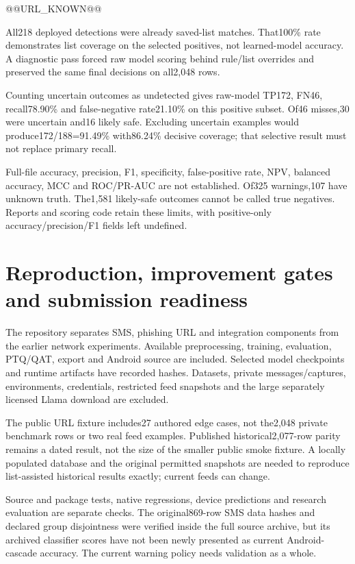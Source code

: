 @@URL_KNOWN@@

All218 deployed detections were already saved-list matches. That100\% rate demonstrates list coverage on the selected positives, not learned-model accuracy. A diagnostic pass forced raw model scoring behind rule/list overrides and preserved the same final decisions on all2,048 rows.

Counting uncertain outcomes as undetected gives raw-model TP172, FN46, recall78.90\% and false-negative rate21.10\% on this positive subset. Of46 misses,30 were uncertain and16 likely safe. Excluding uncertain examples would produce172/188=91.49\% with86.24\% decisive coverage; that selective result must not replace primary recall.

Full-file accuracy, precision, F1, specificity, false-positive rate, NPV, balanced accuracy, MCC and ROC/PR-AUC are not established. Of325 warnings,107 have unknown truth. The1,581 likely-safe outcomes cannot be called true negatives. Reports and scoring code retain these limits, with positive-only accuracy/precision/F1 fields left undefined.

\chapter{Reproduction, improvement gates and submission readiness}
The repository separates SMS, phishing URL and integration components from the earlier network experiments. Available preprocessing, training, evaluation, PTQ/QAT, export and Android source are included. Selected model checkpoints and runtime artifacts have recorded hashes. Datasets, private messages/captures, environments, credentials, restricted feed snapshots and the large separately licensed Llama download are excluded.

The public URL fixture includes27 authored edge cases, not the2,048 private benchmark rows or two real feed examples. Published historical2,077-row parity remains a dated result, not the size of the smaller public smoke fixture. A locally populated database and the original permitted snapshots are needed to reproduce list-assisted historical results exactly; current feeds can change.

Source and package tests, native regressions, device predictions and research evaluation are separate checks. The original869-row SMS data hashes and declared group disjointness were verified inside the full source archive, but its archived classifier scores have not been newly presented as current Android-cascade accuracy. The current warning policy needs validation as a whole.

